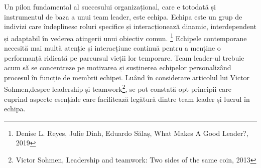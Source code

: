 \documentclass[a4paper, 12pt]{article}
\begin{document}
	\quad\space Un pilon fundamental al succesului organizațional, care e totodată și instrumentul de baza a unui team leader, este echipa. Echipa este un grup de indivizi care îndeplinesc roluri specifice și interacționează dinamic, interdependent și adaptabil în vederea atingerii unui obiectiv comun. \footnote{Denise L. Reyes, Julie Dinh, Eduardo Sălaș, What Makes A Good Leader?, 2019} Echipele contemporane necesită mai multă atenție și interacțiune continuă pentru a menține o performanță ridicată pe parcursul vieții lor temporare. Team leader-ul trebuie acum să se concentreze pe motivarea și susținerea echipelor personalizând procesul în funcție de membrii echipei. Luând în considerare articolul lui Victor Sohmen,despre leadership și teamwork\footnote{ Victor Sohmen, Leadership and teamwork: Two sides of the same coin, 2013}, se pot constată opt principii care cuprind aspecte esențiale care facilitează legătură dintre team leader și lucrul în echipa.
\end{document}
